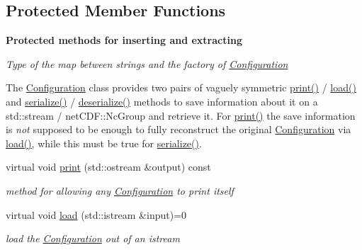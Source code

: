 \subsection*{Protected Member Functions}
\begin{Indent}\textbf{ Protected methods for inserting and extracting}\par
{\em Type of the map between strings and the factory of \mbox{\hyperlink{class_s_m_spp__di__unipi__it_1_1_configuration}{Configuration}}

The \mbox{\hyperlink{class_s_m_spp__di__unipi__it_1_1_configuration}{Configuration}} class provides two pairs of vaguely symmetric \mbox{\hyperlink{class_s_m_spp__di__unipi__it_1_1_configuration_a2e7b9c9148a98c5c342e8c25cac95926}{print()}} / \mbox{\hyperlink{class_s_m_spp__di__unipi__it_1_1_configuration_a27ae9e4279482d52342c7958c34a43c6}{load()}} and \mbox{\hyperlink{class_s_m_spp__di__unipi__it_1_1_configuration_a761852c919ce4cc745f6a973733340c5}{serialize()}} / \mbox{\hyperlink{class_s_m_spp__di__unipi__it_1_1_configuration_a80f801b1a2fd7ab7648faaa9004f06c9}{deserialize()}} methods to save information about it on a std\+::stream / net\+C\+D\+F\+::\+Nc\+Group and retrieve it. For \mbox{\hyperlink{class_s_m_spp__di__unipi__it_1_1_configuration_a2e7b9c9148a98c5c342e8c25cac95926}{print()}} the save information is {\itshape not} supposed to be enough to fully reconstruct the original \mbox{\hyperlink{class_s_m_spp__di__unipi__it_1_1_configuration}{Configuration}} via \mbox{\hyperlink{class_s_m_spp__di__unipi__it_1_1_configuration_a27ae9e4279482d52342c7958c34a43c6}{load()}}, while this must be true for \mbox{\hyperlink{class_s_m_spp__di__unipi__it_1_1_configuration_a761852c919ce4cc745f6a973733340c5}{serialize()}}. }\begin{DoxyCompactItemize}
\item 
virtual void \mbox{\hyperlink{class_s_m_spp__di__unipi__it_1_1_configuration_a2e7b9c9148a98c5c342e8c25cac95926}{print}} (std\+::ostream \&output) const
\begin{DoxyCompactList}\small\item\em method for allowing any \mbox{\hyperlink{class_s_m_spp__di__unipi__it_1_1_configuration}{Configuration}} to print itself \end{DoxyCompactList}\item 
virtual void \mbox{\hyperlink{class_s_m_spp__di__unipi__it_1_1_configuration_a27ae9e4279482d52342c7958c34a43c6}{load}} (std\+::istream \&input)=0
\begin{DoxyCompactList}\small\item\em load the \mbox{\hyperlink{class_s_m_spp__di__unipi__it_1_1_configuration}{Configuration}} out of an istream \end{DoxyCompactList}\end{DoxyCompactItemize}
\end{Indent}
